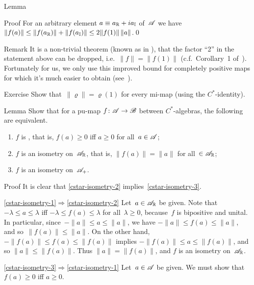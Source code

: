 \documentclass[a]{subfiles}
\begin{document}
\begin{parsec}
\begin{point}{Lemma}
\begin{point}{Proof}
For an arbitrary element $a\equiv a_{\mathbb{R}}+ia_{\mathbb{I}}$
of~$\mathscr{A}$
we have 
$\|f(a)\|\leq \|f(a_{\mathbb{R}})\|+\|f(a_{\mathbb{I}})\|\leq 2\|f(1)\|\,\|a\|$.\qed
\end{point}
\begin{point}{Remark}%
It is a non-trivial theorem (known as 
in \cite{paulsen}),
that the factor ``2'' in the statement above
can be dropped, i.e.~$\|f\|=\|f(1)\|$
(c.f.~Corollary~1 of~\cite{russodye}).
Fortunately for us,
we only use
this improved bound
for completely positive maps
for which it's much easier to obtain (see~).
\end{point}
\begin{point}{Exercise}%
Show that~$\|\varrho\|=\varrho(1)$
for every mi-map
(using the $C^*$-identity).
\end{point}
\end{point}
\begin{point}{Lemma}%
Show that for a pu-map $f\colon \mathscr{A}\to\mathscr{B}$
between $C^*$-algebras,
the following are equivalent.
\begin{enumerate}
\item\label{cstar-isometry-1}
	$f$ is , that is, $f(a)\geq 0$ iff $a\geq 0$
	for all~$a\in\mathscr{A}$;
\item\label{cstar-isometry-2}
	$f$ is an isometry on~$\mathscr{A}_{\mathbb{R}}$, 
	that is, $\|f(a)\|=\|a\|$ for all~$\in \mathscr{A}_{\mathbb{R}}$;
\item\label{cstar-isometry-3}
	$f$ is an isometry on~$\mathscr{A}_{+}$.
\end{enumerate}
\begin{point}{Proof}%
It is clear that \ref{cstar-isometry-2} implies~\ref{cstar-isometry-3}.
\begin{point}{\ref{cstar-isometry-1}$\Longrightarrow$\ref{cstar-isometry-2}}%
Let~$a\in \mathscr{A}_{\mathbb{R}}$ be given.
Note that $-\lambda \leq a\leq \lambda$
iff $-\lambda \leq f(a) \leq \lambda$
for all~$\lambda \geq 0$,
because~$f$ is bipositive and unital.
In particular,
since~$-\|a\|\leq a\leq \|a\|$,
we have $-\|a\|\leq f(a)\leq \|a\|$,
and so~$\|f(a)\|\leq \|a\|$.
On the other hand,
$-\|f(a)\|\leq f(a)\leq \|f(a)\|$
implies $-\|f(a)\|\leq a\leq \|f(a)\|$,
and so $\|a\|\leq \|f(a)\|$.
Thus $\|a\|=\|f(a)\|$,
and $f$ is an isometry on~$\mathscr{A}_{\mathbb{R}}$.
\end{point}
\begin{point}{\ref{cstar-isometry-3}$\Longrightarrow$\ref{cstar-isometry-1}}%
Let~$a\in \mathscr{A}$ be given.
We must show that~$f(a)\geq 0$ iff $a\geq 0$.

\end{point}
\end{point}
\end{point}
\end{parsec}
\end{document}
